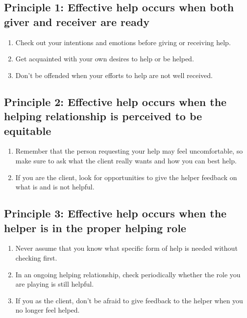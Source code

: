 \documentclass{article}
\newenvironment{nosepenumerate}
{ \begin{enumerate}
    \setlength{\itemsep}{0pt}
    \setlength{\parskip}{0pt}
    \setlength{\parsep}{0pt}     }
{ \end{enumerate}                  }
\begin{document}
\begin{multicols}{2}

\subsection{Principle 1: Effective help occurs when both giver and receiver are ready}
\begin{nosepenumerate}
    \item Check out your intentions and emotions before giving or receiving help.
    \item Get acquainted with your own desires to help or be helped.
    \item Don't be offended when your efforts to help are not well received.
\end{nosepenumerate}

\subsection{Principle 2: Effective help occurs when the helping relationship is perceived to be equitable}
\begin{nosepenumerate}
    \item Remember that the person requesting your help may feel uncomfortable, so make sure to ask what the client really wants and how you can best help.
    \item If you are the client, look for opportunities to give the helper feedback on what is and is not helpful.
\end{nosepenumerate}

\subsection{Principle 3: Effective help occurs when the helper is in the proper helping role}
\begin{nosepenumerate}
    \item Never assume that you know what specific form of help is needed without checking first.
    \item In an ongoing helping relationship, check periodically whether the role you are playing is still helpful.
    \item If you as the client, don't be afraid to give feedback to the helper when you no longer feel helped.
\end{nosepenumerate}


\end{multicols}
\end{document}
